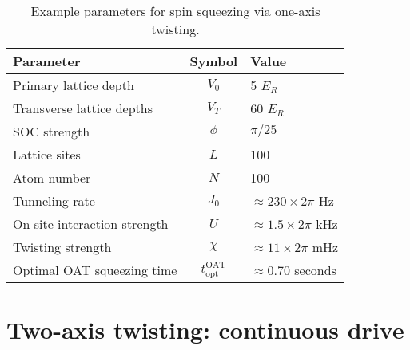 \documentclass[aps,notitlepage,nofootinbib,11pt]{revtex4-1}
\renewcommand{\t}{\text} %
\newcommand{\1}{\mathds{1}}
\begin{document}
\begin{table}[h]
  \centering
  \caption{Example parameters for spin squeezing via one-axis
    twisting.}
  \label{tab:parameters}
  \begin{tabular}{|l|c|l|}
    \hline
    Parameter & Symbol & Value \\ \hline\hline
    Primary lattice depth & $V_0$ & 5 $E_R$ \\
    Transverse lattice depths & $V_T$ & 60 $E_R$ \\
    SOC strength & $\phi$ & $\pi/25$ \\
    Lattice sites & $L$ & 100 \\
    Atom number & $N$ & 100 \\ \hline\hline
    Tunneling rate & $J_0$ & $\approx230\times2\pi$ Hz \\
    On-site interaction strength & $U$ & $\approx1.5\times2\pi$ kHz \\
    Twisting strength & $\chi$ & $\approx11\times2\pi$ mHz \\
    Optimal OAT squeezing time & $t_{\t{opt}}^{\t{OAT}}$
    & $\approx0.70$ seconds \\ \hline
  \end{tabular}
\end{table}


\section{Two-axis twisting: continuous drive}
\label{sec:continuous_drive}
\end{document}
